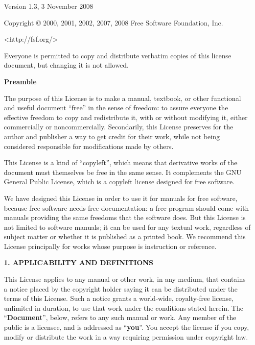 \documentclass[10pt,a4paper,ngerman,titlepage,tocindentauto]{article}
\begin{document}
		\begin{multicols}{3}
			{\tiny
				\begin{center}
						 Version 1.3, 3 November 2008

				 Copyright \copyright{} 2000, 2001, 2002, 2007, 2008  Free Software Foundation, Inc.
				 
				 \bigskip
				 
					  <http://fsf.org/>
				  
				 \bigskip
				 
				 Everyone is permitted to copy and distribute verbatim copies
				 of this license document, but changing it is not allowed.
				\end{center}


				\begin{center}
				{\bf Preamble}
				\end{center}

				The purpose of this License is to make a manual, textbook, or other
				functional and useful document ``free'' in the sense of freedom: to
				assure everyone the effective freedom to copy and redistribute it,
				with or without modifying it, either commercially or noncommercially.
				Secondarily, this License preserves for the author and publisher a way
				to get credit for their work, while not being considered responsible
				for modifications made by others.

				This License is a kind of ``copyleft'', which means that derivative
				works of the document must themselves be free in the same sense.  It
				complements the GNU General Public License, which is a copyleft
				license designed for free software.

				We have designed this License in order to use it for manuals for free
				software, because free software needs free documentation: a free
				program should come with manuals providing the same freedoms that the
				software does.  But this License is not limited to software manuals;
				it can be used for any textual work, regardless of subject matter or
				whether it is published as a printed book.  We recommend this License
				principally for works whose purpose is instruction or reference.


				\begin{center}
				{\bf 1. APPLICABILITY AND DEFINITIONS\par}
				\end{center}

				This License applies to any manual or other work, in any medium, that
				contains a notice placed by the copyright holder saying it can be
				distributed under the terms of this License.  Such a notice grants a
				world-wide, royalty-free license, unlimited in duration, to use that
				work under the conditions stated herein.  The ``\textbf{Document}'', below,
				refers to any such manual or work.  Any member of the public is a
				licensee, and is addressed as ``\textbf{you}''.  You accept the license if you
				copy, modify or distribute the work in a way requiring permission
				under copyright law.

}
\end{multicols}
\end{document}
